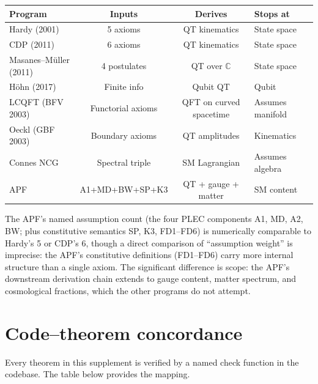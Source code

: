 \documentclass[11pt,a4paper]{article}
\theoremstyle{definition}
\begin{document}
\smallskip
\begin{center}
\small
\begin{tabular}{@{}lccl@{}}
\toprule
\textbf{Program} & \textbf{Inputs} & \textbf{Derives} & \textbf{Stops at} \\
\midrule
Hardy (2001) & 5 axioms & QT kinematics & State space \\
CDP (2011) & 6 axioms & QT kinematics & State space \\
Masanes--M\"uller (2011) & 4 postulates & QT over $\mathbb{C}$ & State space \\
H\"ohn (2017) & Finite info & Qubit QT & Qubit \\
LCQFT (BFV 2003) & Functorial axioms & QFT on curved spacetime & Assumes manifold \\
Oeckl (GBF 2003) & Boundary axioms & QT amplitudes & Kinematics \\
Connes NCG & Spectral triple & SM Lagrangian & Assumes algebra \\
APF & A1+MD+BW+SP+K3 & QT + gauge + matter & SM content \\
\bottomrule
\end{tabular}
\end{center}

\smallskip\noindent The APF's named assumption count (the four PLEC components A1, MD, A2, BW; plus constitutive semantics SP, K3, FD1--FD6) is numerically comparable to Hardy's 5 or CDP's 6,
though a direct comparison of ``assumption weight'' is imprecise: the
APF's constitutive definitions (FD1--FD6) carry more internal structure
than a single axiom.  The significant difference is scope: the APF's
downstream derivation chain extends to gauge content, matter spectrum,
and cosmological fractions, which the other programs do not attempt.


\section{Code--theorem concordance}
\label{app:code}

Every theorem in this supplement is verified by a named check function
in the codebase.  The table below provides the mapping.
\end{document}
